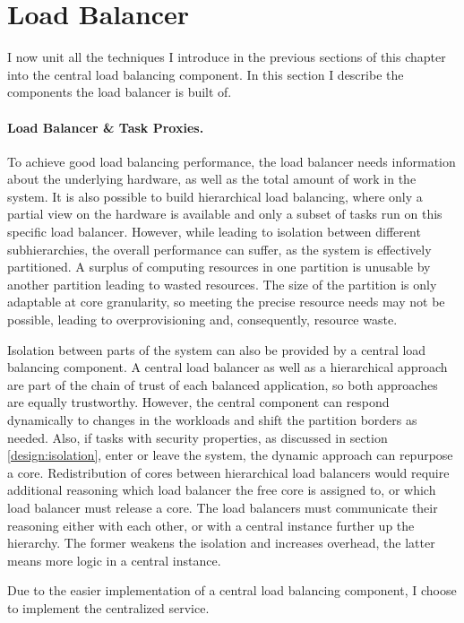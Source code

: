 \section{Load Balancer}
\label{design:balancer}

I now unit all the techniques I introduce in the previous sections of this chapter
into the central load balancing component.
In this section I describe the components the load balancer is built of.


\paragraph{Load Balancer \& Task Proxies.}
To achieve good load balancing performance, the load balancer needs information
about the underlying hardware, as well as the total amount of work in the system.
It is also possible to build hierarchical load balancing, where
only a partial view on the hardware is available and only a subset of tasks run
on this specific load balancer.
However, while leading to isolation between different subhierarchies,
the overall performance can suffer, as the system is effectively partitioned.
A surplus of computing resources in one partition is unusable by another
partition leading to wasted resources.
The size of the partition is only adaptable at core granularity, so meeting the
precise resource needs may not be possible, leading to overprovisioning and,
consequently, resource waste.

Isolation between parts of the system can also be provided by a central load
balancing component.
A central load balancer as well as a hierarchical approach are part of the chain
of trust of each balanced application, so both approaches are equally
trustworthy.
However, the central component can respond dynamically to changes in the workloads and
shift the partition borders as needed.
Also, if tasks with security properties, as discussed in section
\ref{design:isolation}, enter or leave the system, the dynamic approach can
repurpose a core.
Redistribution of cores between hierarchical load balancers would require
additional reasoning which load balancer the free core is assigned to, or which
load balancer must release a core.
The load balancers must communicate their reasoning either with each other, or
with a central instance further up the hierarchy.
The former weakens the isolation and increases overhead, the latter means more
logic in a central instance.

Due to the easier implementation of a central load balancing component,
I choose to implement the centralized service.
\\

